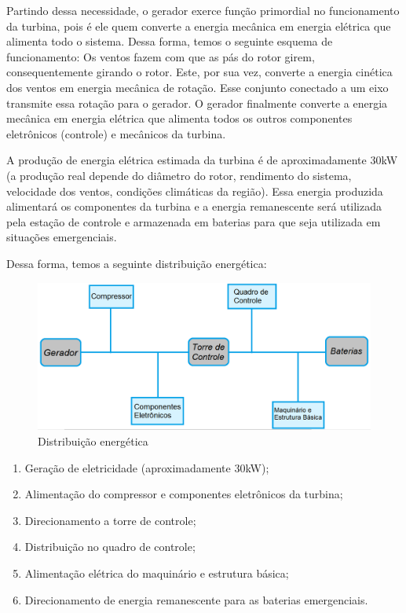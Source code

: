     Partindo dessa necessidade, o gerador exerce função primordial no funcionamento da turbina, pois é ele quem converte a
    energia mecânica em energia elétrica que alimenta todo o sistema. Dessa forma, temos o seguinte esquema de funcionamento:
    Os ventos fazem com que as pás do rotor girem, consequentemente girando o rotor. Este, por sua vez, converte a energia 
    cinética dos ventos em energia mecânica de rotação. Esse conjunto conectado a um eixo transmite essa rotação para o
    gerador. O gerador finalmente converte a energia mecânica em energia elétrica que alimenta todos os outros componentes
    eletrônicos (controle) e mecânicos da turbina.
    
    A produção de energia elétrica estimada da turbina é de aproximadamente 30kW (a produção real depende do diâmetro do rotor,
    rendimento do sistema, velocidade dos ventos, condições climáticas da região). Essa energia produzida alimentará os
    componentes da turbina e a energia remanescente será utilizada pela estação de controle e armazenada em baterias para
    que seja utilizada em situações emergenciais.
    
    Dessa forma, temos a seguinte distribuição energética:
    
    \begin{figure}[!ht]
    \centering
    \includegraphics[scale=0.45]{editaveis/figuras/distribuicao_energetica}
    \caption{Distribuição energética}
    \label{distribuicao_energetica}
    \end{figure}
    
    \begin{enumerate}
     \item Geração de eletricidade (aproximadamente 30kW);
     \item Alimentação do compressor e componentes eletrônicos da turbina;
     \item Direcionamento a torre de controle;
     \item Distribuição no quadro de controle;
     \item Alimentação elétrica do maquinário e estrutura básica;
     \item Direcionamento de energia remanescente para as baterias emergenciais.
    \end{enumerate}
    
